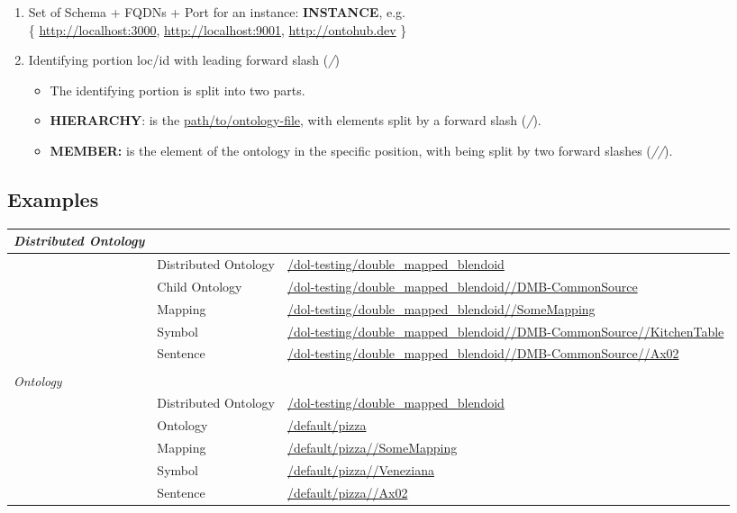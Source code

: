 \documentclass[a4paper,11pt,DIV=25]{scrartcl}
\begin{document}
\begin{enumerate}
  \item Set of Schema + FQDNs + Port for an instance: \textbf{INSTANCE}, e.g.\\
    \{ \url{http://localhost:3000}, \url{http://localhost:9001}, \url{http://ontohub.dev} \}
  \item Identifying portion loc/id with leading forward slash (\textit{/})
  \begin{itemize}
    \item The identifying portion is split into two parts.
    \item \textbf{HIERARCHY}: is the \url{path/to/ontology-file}, with elements split
      by a forward slash (\textit{/}).
    \item \textbf{MEMBER:} is the element of the ontology in the specific position, with
       being split by two forward slashes (\textit{//}).
  \end{itemize}
\end{enumerate}

\subsection{Examples}

\begin{tabularx}{\textwidth}{p{}p{}p{}}
  \textit{Distributed Ontology} & & \\
  \hline
  & Distributed Ontology & \url{/dol-testing/double_mapped_blendoid}\\
  & Child Ontology & \url{/dol-testing/double_mapped_blendoid//DMB-CommonSource}\\
  & Mapping & \url{/dol-testing/double_mapped_blendoid//SomeMapping}\\
  & Symbol & \url{/dol-testing/double_mapped_blendoid//DMB-CommonSource//KitchenTable}\\
  & Sentence & \url{/dol-testing/double_mapped_blendoid//DMB-CommonSource//Ax02}\\
  & & \\
  \textit{Ontology} & & \\
  \hline
  & Distributed Ontology & \url{/dol-testing/double_mapped_blendoid}\\
  & Ontology & \url{/default/pizza}\\
  & Mapping & \url{/default/pizza//SomeMapping}\\
  & Symbol & \url{/default/pizza//Veneziana}\\
  & Sentence & \url{/default/pizza//Ax02}\\
\end{tabularx}
\end{document}
